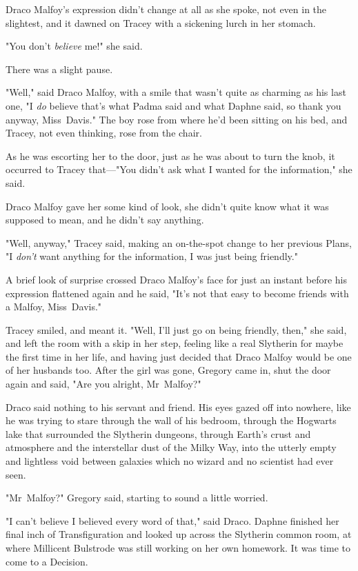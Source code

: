 Draco Malfoy's expression didn't change at all as she spoke, not even in the
slightest, and it dawned on Tracey with a sickening lurch in her stomach.

"You don't \emph{believe} me!" she said.

There was a slight pause.

"Well," said Draco Malfoy, with a smile that wasn't quite as charming as his
last one, "I \emph{do} believe that's what Padma said and what Daphne said, so
thank you anyway, Miss~Davis." The boy rose from where he'd been sitting on his
bed, and Tracey, not even thinking, rose from the chair.

As he was escorting her to the door, just as he was about to turn the knob, it
occurred to Tracey that—"You didn't ask what I wanted for the information,"
she said.

Draco Malfoy gave her some kind of look, she didn't quite know what it was
supposed to mean, and he didn't say anything.

"Well, anyway," Tracey said, making an on-the-spot change to her previous
Plans, "I \emph{don't} want anything for the information, I was just being
friendly."

A brief look of surprise crossed Draco Malfoy's face for just an instant before
his expression flattened again and he said, "It's not that easy to become
friends with a Malfoy, Miss~Davis."

Tracey smiled, and meant it. "Well, I'll just go on being friendly, then," she
said, and left the room with a skip in her step, feeling like a real Slytherin
for maybe the first time in her life, and having just decided that Draco Malfoy
would be one of her husbands too.
\later
After the girl was gone, Gregory came in, shut the door again and said, "Are
you alright, Mr~Malfoy?"

Draco said nothing to his servant and friend. His eyes gazed off into nowhere,
like he was trying to stare through the wall of his bedroom, through the
Hogwarts lake that surrounded the Slytherin dungeons, through Earth's crust and
atmosphere and the interstellar dust of the Milky Way, into the utterly empty
and lightless void between galaxies which no wizard and no scientist had ever
seen.

"Mr~Malfoy?" Gregory said, starting to sound a little worried.

"I can't believe I believed every word of that," said Draco.
\later
Daphne finished her final inch of Transfiguration and looked up across the
Slytherin common room, at where Millicent Bulstrode was still working on her
own homework. It was time to come to a Decision.

